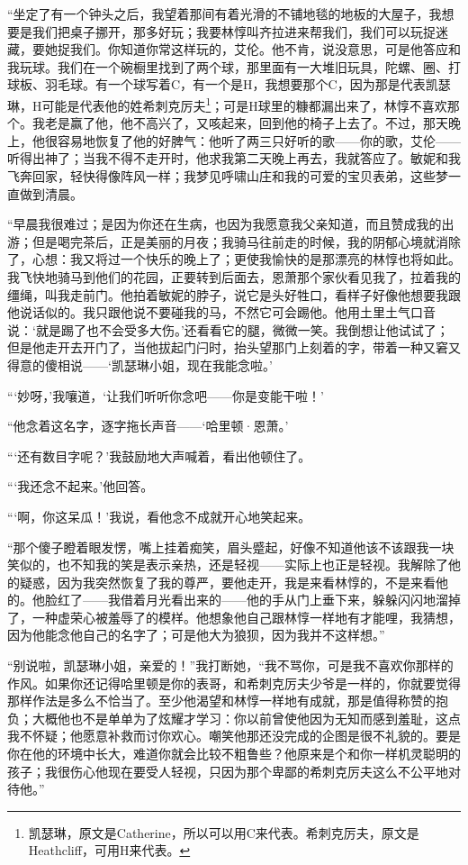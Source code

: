 \par “坐定了有一个钟头之后，我望着那间有着光滑的不铺地毯的地板的大屋子，我想要是我们把桌子挪开，那多好玩；我要林惇叫齐拉进来帮我们，我们可以玩捉迷藏，要她捉我们。你知道你常这样玩的，艾伦。他不肯，说没意思，可是他答应和我玩球。我们在一个碗橱里找到了两个球，那里面有一大堆旧玩具，陀螺、圈、打球板、羽毛球。有一个球写着C，有一个是H，我想要那个C，因为那是代表凯瑟琳，H可能是代表他的姓希刺克厉夫\footnote{凯瑟琳，原文是Catherine，所以可以用C来代表。希刺克厉夫，原文是Heathcliff，可用H来代表。}；可是H球里的糠都漏出来了，林惇不喜欢那个。我老是赢了他，他不高兴了，又咳起来，回到他的椅子上去了。不过，那天晚上，他很容易地恢复了他的好脾气：他听了两三只好听的歌——你的歌，艾伦——听得出神了；当我不得不走开时，他求我第二天晚上再去，我就答应了。敏妮和我飞奔回家，轻快得像阵风一样；我梦见呼啸山庄和我的可爱的宝贝表弟，这些梦一直做到清晨。
\par “早晨我很难过；是因为你还在生病，也因为我愿意我父亲知道，而且赞成我的出游；但是喝完茶后，正是美丽的月夜；我骑马往前走的时候，我的阴郁心境就消除了，心想：我又将过一个快乐的晚上了；更使我愉快的是那漂亮的林惇也将如此。我飞快地骑马到他们的花园，正要转到后面去，恩萧那个家伙看见我了，拉着我的缰绳，叫我走前门。他拍着敏妮的脖子，说它是头好牲口，看样子好像他想要我跟他说话似的。我只跟他说不要碰我的马，不然它可会踢他。他用土里土气口音说：‘就是踢了也不会受多大伤。’还看看它的腿，微微一笑。我倒想让他试试了；但是他走开去开门了，当他拔起门闩时，抬头望那门上刻着的字，带着一种又窘又得意的傻相说——‘凯瑟琳小姐，现在我能念啦。’
\par “‘妙呀，’我嚷道，‘让我们听听你念吧——你是变能干啦！’
\par “他念着这名字，逐字拖长声音——‘哈里顿·恩萧。’
\par “‘还有数目字呢？’我鼓励地大声喊着，看出他顿住了。
\par “‘我还念不起来。’他回答。
\par “‘啊，你这呆瓜！’我说，看他念不成就开心地笑起来。
\par “那个傻子瞪着眼发愣，嘴上挂着痴笑，眉头蹙起，好像不知道他该不该跟我一块笑似的，也不知我的笑是表示亲热，还是轻视——实际上也正是轻视。我解除了他的疑惑，因为我突然恢复了我的尊严，要他走开，我是来看林惇的，不是来看他的。他脸红了——我借着月光看出来的——他的手从门上垂下来，躲躲闪闪地溜掉了，一种虚荣心被羞辱了的模样。他想象他自己跟林惇一样地有才能哩，我猜想，因为他能念他自己的名字了；可是他大为狼狈，因为我并不这样想。”
\par “别说啦，凯瑟琳小姐，亲爱的！”我打断她，“我不骂你，可是我不喜欢你那样的作风。如果你还记得哈里顿是你的表哥，和希刺克厉夫少爷是一样的，你就要觉得那样作法是多么不恰当了。至少他渴望和林惇一样地有成就，那是值得称赞的抱负；大概他也不是单单为了炫耀才学习：你以前曾使他因为无知而感到羞耻，这点我不怀疑；他愿意补救而讨你欢心。嘲笑他那还没完成的企图是很不礼貌的。要是你在他的环境中长大，难道你就会比较不粗鲁些？他原来是个和你一样机灵聪明的孩子；我很伤心他现在要受人轻视，只因为那个卑鄙的希刺克厉夫这么不公平地对待他。”
